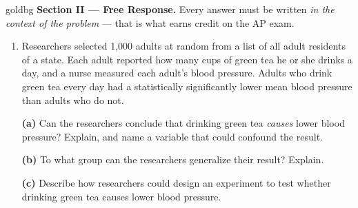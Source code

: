 \documentclass[12pt]{article}
\begin{document}
\vspace{0.08in}

\boxguard[27]
\begin{headlinebox}{goldbg}
\small
\textbf{Section II --- Free Response.} Every answer must be written \emph{in the context of the
problem} --- that is what earns credit on the AP exam.
\end{headlinebox}

\vspace{0.06in}

\begin{enumerate}[leftmargin=1.9em, itemsep=0.10in, resume]

  \item Researchers selected 1{,}000 adults at random from a list of all adult residents of a
        state. Each adult reported how many cups of green tea he or she drinks a day, and a
        nurse measured each adult's blood pressure. Adults who drink green tea every day had a
        statistically significantly lower mean blood pressure than adults who do not.

        \vspace{6pt}

        \boxguard[30]
        \textbf{(a)} Can the researchers conclude that drinking green tea \emph{causes} lower
        blood pressure? Explain, and name a variable that could confound the result.\\[4pt]

        \vspace{4pt}
        \boxguard[30]
        \textbf{(b)} To what group can the researchers generalize their result? Explain.\\[4pt]

        \vspace{4pt}
        \boxguard[30]
        \textbf{(c)} Describe how researchers could design an experiment to test whether
        drinking green tea causes lower blood pressure.\\[4pt]

\end{enumerate}
\end{document}
